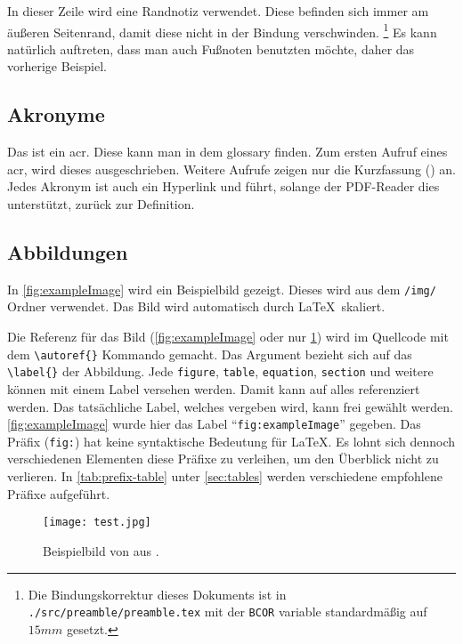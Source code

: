 In dieser Zeile wird eine Randnotiz verwendet.
Diese befinden sich immer am äußeren Seitenrand, damit diese nicht in der Bindung verschwinden.
\footnote{Die Bindungskorrektur dieses Dokuments ist in \texttt{./src/preamble/preamble.tex} mit der \texttt{BCOR} variable standardmäßig auf $15\si{mm}$ gesetzt.}
Es kann natürlich auftreten, dass man auch Fußnoten benutzten möchte, daher das vorherige Beispiel.

\subsection{Akronyme}

Das ist ein \gls{acr}.
Diese kann man in dem \gls{glossary} finden.
Zum ersten Aufruf eines \gls{acr}, wird dieses ausgeschrieben.
Weitere Aufrufe zeigen nur die Kurzfassung () an.
Jedes Akronym ist auch ein Hyperlink und führt, solange der PDF-Reader dies unterstützt, zurück zur Definition.

\subsection{Abbildungen}

In \autoref{fig:exampleImage} wird ein Beispielbild gezeigt.
Dieses wird aus dem \texttt{/img/} Ordner verwendet.
Das Bild wird automatisch durch \LaTeX\ skaliert.

Die Referenz für das Bild (\autoref{fig:exampleImage} oder nur \ref{fig:exampleImage}) wird im Quellcode mit dem \texttt{\textbackslash autoref\{\}} Kommando gemacht.
Das Argument bezieht sich auf das \texttt{\textbackslash label\{\}} der Abbildung.
Jede \texttt{figure}, \texttt{table}, \texttt{equation}, \texttt{section} und weitere können mit einem Label versehen werden.
Damit kann auf alles referenziert werden.
Das tatsächliche Label, welches vergeben wird, kann frei gewählt werden.
\autoref{fig:exampleImage} wurde hier das Label \enquote{\texttt{fig:exampleImage}} gegeben.
Das Präfix (\texttt{fig:}) hat keine syntaktische Bedeutung für \LaTeX.
Es lohnt sich dennoch verschiedenen Elementen diese Präfixe zu verleihen, um den Überblick nicht zu verlieren.
In \autoref{tab:prefix-table} unter \autoref{sec:tables} werden verschiedene empfohlene Präfixe aufgeführt.

\begin{figure}[ht]
    \centering
    \texttt{[image: test.jpg]}
    \caption[Beispielbild]{Beispielbild von \citeauthor{exampleImage} aus \autocite{exampleImage}.}
    \label{fig:exampleImage}
\end{figure}

